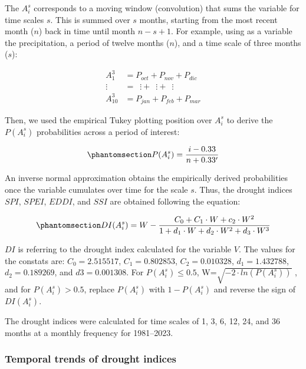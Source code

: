 \documentclass[
  sn-nature,
  numbered]{sn-jnl}
\begin{document}
The \(A^s_i\) corresponds to a moving window (convolution) that sums the
variable for time scales \(s\). This is summed over \(s\) months,
starting from the most recent month (\(n\)) back in time until month
\(n-s+1\). For example, using as a variable the precipitation, a period
of twelve months (\(n\)), and a time scale of three months (\(s\)):

\[
\begin{split}
A^3_1 &= P_{oct} +P_{nov} +P_{dic} \\
\vdots\,\,\, &= \,\,\,\vdots + \,\,\,\vdots + \,\,\,\vdots \\
A^3_{10} &= P_{jan}+P_{feb} +P_{mar}
\end{split}
\]

Then, we used the empirical Tukey plotting position \citep{Wilks2011}
over \(A_i^s\) to derive the \(P(A_i^s)\) probabilities across a period
of interest:

\begin{equation}\phantomsection\label{eq-probPai}{P(A^s_i) = \frac{i-0.33}{n+0.33'}}\end{equation}

An inverse normal approximation \citep{Abramowitz1968} obtains the
empirically derived probabilities once the variable cumulates over time
for the scale \(s\). Thus, the drought indices \(SPI\), \(SPEI\),
\(EDDI\), and \(SSI\) are obtained following the equation:

\begin{equation}\phantomsection\label{eq-DI}{DI(A^s_i) = W - \frac{C_0+C_1\cdot W + c_2 \cdot W^2}{1+d_1\cdot W +d_2\cdot W^2 +d_3\cdot W^3}}\end{equation}

\(DI\) is referring to the drought index calculated for the variable
\(V\). The values for the constats are: \(C_0 = 2.515517\),
\(C_1 = 0.802853\), \(C_2 = 0.010328\), \(d_1 = 1.432788\),
\(d_2 = 0.189269\), and \(d3 = 0.001308\). For \(P(A^s_i) \leq 0.5\),
W=\(\sqrt{-2\cdot ln(P(A^s_i))}\) , and for \(P(A^s_i) > 0.5\), replace
\(P(A^s_i)\) with \(1-P(A^s_i)\) and reverse the sign of \(DI(A^s_i)\).

The drought indices were calculated for time scales of 1, 3, 6, 12, 24,
and 36 months at a monthly frequency for 1981--2023.

\subsubsection{Temporal trends of drought
indices}\label{temporal-trends-of-drought-indices}
\end{document}
